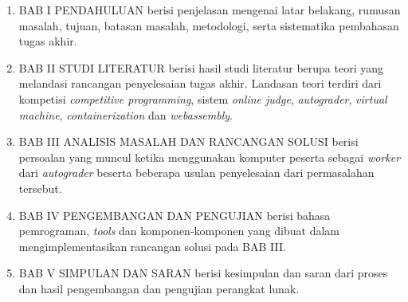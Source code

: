 \begin{enumerate}
	\item BAB I PENDAHULUAN berisi penjelasan mengenai latar belakang, rumusan masalah, tujuan, batasan masalah, metodologi, serta sistematika pembahasan tugas akhir.
	\item BAB II STUDI LITERATUR berisi hasil studi literatur berupa teori yang melandasi rancangan penyelesaian tugas akhir. Landasan teori terdiri dari kompetisi \textit{competitive programming}, sistem \textit{online judge}, \textit{autograder}, \textit{virtual machine}, \textit{containerization} dan \textit{webassembly}.
	\item BAB III ANALISIS MASALAH DAN RANCANGAN SOLUSI berisi persoalan yang muncul ketika menggunakan komputer peserta sebagai \textit{worker} dari \textit{autograder} beserta beberapa usulan penyelesaian dari permasalahan tersebut.
	\item BAB IV PENGEMBANGAN DAN PENGUJIAN berisi bahasa pemrograman, \textit{tools} dan komponen-komponen yang dibuat dalam mengimplementasikan rancangan solusi pada BAB III.
	\item BAB V SIMPULAN DAN SARAN berisi kesimpulan dan saran dari proses dan hasil pengembangan dan pengujian perangkat lunak.
\end{enumerate}
